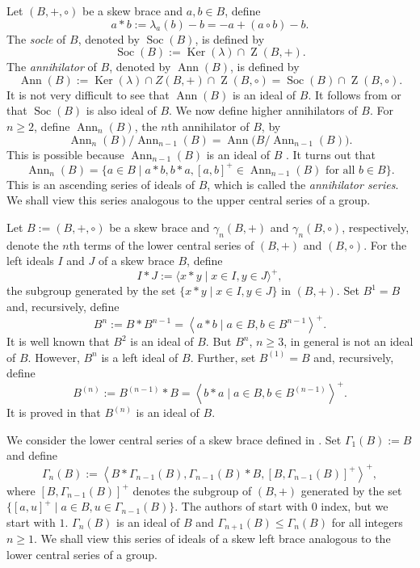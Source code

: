 \documentclass[oneside]{amsart}
\numberwithin{equation}{section}
\theoremstyle{plain}
\theoremstyle{definition}
\newcommand{\Z}{\operatorname{Z} }
\newcommand{\gen}[1]{\left < #1 \right >}
\newcommand{\Ker}{\operatorname{Ker} }
\newcommand{\Soc}{\operatorname{Soc} }
\newcommand{\Ann}{\operatorname{Ann} }
\begin{document}
Let $(B, +, \circ)$ be a skew brace and $a, b \in B$, define 
$$a \ast b := \lambda_a(b) - b = -a + (a \circ b) - b.$$
 The  {\it socle} of $B$,  denoted by $\Soc(B)$, is defined by 
 $$\Soc(B) := \Ker(\lambda) \cap \Z(B,+).$$
The  {\it annihilator} of $B$, denoted by $\Ann(B)$, is defined by 
 $$\Ann(B) := \Ker(\lambda) \cap Z(B,+) \cap \Z(B, \circ) = \Soc(B) \cap  \Z(B, \circ).$$
 It is not very difficult to see that  $\Ann(B)$  is an ideal of $B$. It  follows from \cite[Lemma 2.5]{GV17} or \cite[Proposition 2.9]{BEP24} that   $\Soc(B)$ is also ideal of $B$. We now define higher annihilators of $B$. For $n \ge 2$, define $\Ann_n(B)$, the $n$th annihilator  of $B$, by
$$\Ann_n(B) / \Ann_{n-1}(B) = \Ann\big(B /  \Ann_{n-1}(B)\big).$$
This is possible because $\Ann_{n-1}(B)$ is an ideal of $B$ \cite[Definition 2.2]{JAV23}.  It turns out that 
$$\Ann_n(B) = \{a \in B \mid a*b, b*a,  [a, b]^{+}  \in \Ann_{n-1}(B) \mbox{ for all } b \in B\}.$$
This is an ascending series of ideals of $B$, which is called the  \textit{annihilator series}. We shall view this series  analogous to the upper central series of a group.

Let $B := (B, +, \circ)$ be a skew  brace and $\gamma_n(B, +)$ and  $\gamma_n(B, \circ)$, respectively, denote the $n$th terms of the lower central series of $(B, +)$ and $(B, \circ)$.  For the left ideals $I$ and $J$ of a skew brace $B$, define 
 $$I*J := \langle x*y \mid x \in I, y \in J\rangle^{+},$$ 
 the subgroup generated by the set $\{x*y \mid x \in I, y \in J\}$ in $(B, +)$.
 Set $B^1 = B$ and, recursively, define 
$$B^n :=  B*B^{n-1} = \gen{a*b \mid a \in B, b\in B^{n-1}}^{+}.$$
 It is well known that $B^2$ is an ideal of $B$. But $B^n$, $n \ge 3$, in general is not an ideal of $B$. However, $B^n$ is a left ideal of $B$.  Further, set $B^{(1)} = B$ and, recursively, define 
$$B^{(n)} :=  B^{(n-1)}*B = \gen{b*a \mid a \in B, b\in B^{(n-1)}}^{+}.$$
 It is proved in \cite[Proposition 2.1]{CSV19} that $B^{(n)}$ is an ideal of $B$.
 
 We consider the lower central series of a skew brace defined in \cite{BJ23}. 
  Set $\Gamma_1(B)  := B$ and define
$$\Gamma_n(B) := \gen{B* \Gamma_{n-1}(B), \Gamma_{n-1}(B) * B, [B, \Gamma_{n-1}(B)]^{+}}^{+},$$
where $[B, \Gamma_{n-1}(B)]^{+}$ denotes the subgroup of $(B, +)$ generated by the set $\{[a, u]^{+} \mid a \in B, u \in \Gamma_{n-1}(B)\}$.
The authors of  \cite{BJ23} start with $0$ index, but we start with $1$. $\Gamma_n(B)$ is an ideal of $B$ and  $\Gamma_{n+1}(B) \le \Gamma_{n}(B)$ for all integers  $n \ge 1$. We shall view this series of ideals of a skew left  brace analogous to the lower central series of a group.
\end{document}

